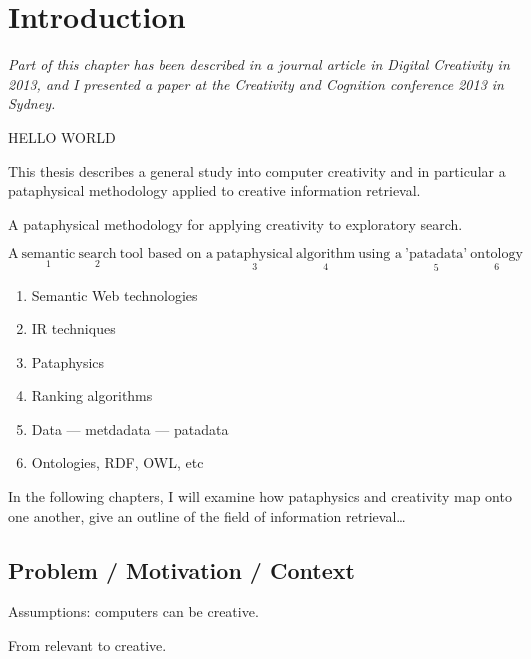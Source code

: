
\chapter{Introduction}
\label{ch:intro}

\startcontents[chapters]
\minicontents

\emph{Part of this chapter has been described in a journal article in Digital Creativity in 2013, and I presented a paper at the Creativity and Cognition conference 2013 in Sydney.} 

\grule %

{\color{red} HELLO WORLD}%

This thesis describes a general study into computer creativity and in particular a pataphysical methodology applied to creative information retrieval.

A pataphysical methodology for applying creativity to exploratory search.

{\small $\text{A} \ \underset{1}{\text{semantic}} \ \underset{2}{\text{search}} \ \text{tool based on a} \ \underset{3}{\text{pataphysical}} \ \underset{4}{\text{algorithm}} \ \text{using a} \ \underset{5}{\text{'patadata'}} \ \underset{6}{\text{ontology}}$
}

\begin{enumerate}
  \item Semantic Web technologies
  \item IR techniques
  \item Pataphysics
  \item Ranking algorithms
  \item Data --- metdadata --- patadata
  \item Ontologies, RDF, OWL, etc
\end{enumerate}


In the following chapters, I will examine how pataphysics and creativity map onto one another, give an outline of the field of information retrieval\ldots

\section{Problem / Motivation / Context}

Assumptions: computers can be creative.

From relevant to creative.

